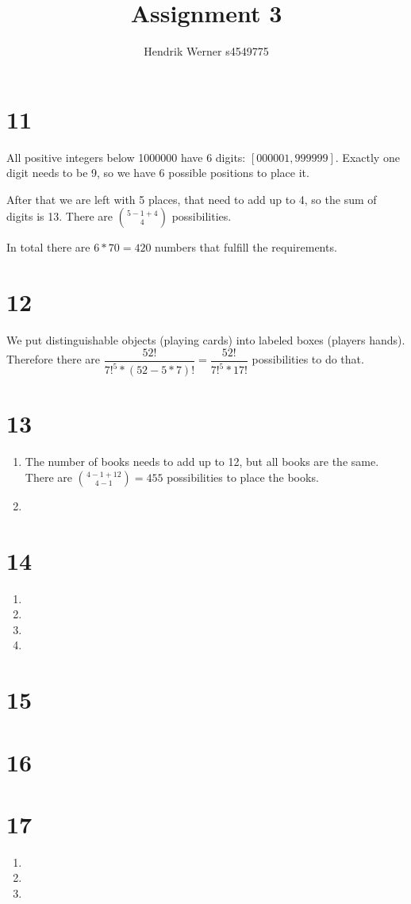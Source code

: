 \documentclass[12pt]{article}
\title{Assignment 3}
\author{
	Hendrik Werner s4549775
}
\begin{document}
\maketitle

\section*{11}
All positive integers below 1000000 have 6 digits: $[000001, 999999]$. Exactly one digit needs to be 9, so we have 6 possible positions to place it.

After that we are left with 5 places, that need to add up to 4, so the sum of digits is 13. There are $\binom{5 - 1 + 4}{4}$ possibilities.

In total there are $6 * 70 = 420$ numbers that fulfill the requirements.

\section*{12}
We put distinguishable objects (playing cards) into labeled boxes (players hands). Therefore there are $\dfrac{52!}{7!^5 * (52 - 5 * 7)!} =  \dfrac{52!}{7!^5 * 17!}$ possibilities to do that.

\section*{13}
\begin{enumerate}[a]
	\item %
	The number of books needs to add up to 12, but all books are the same. There are $\binom{4 - 1 + 12}{4 - 1} = 455$ possibilities to place the books.

	\item %
\end{enumerate}

\section*{14}
\begin{enumerate}[a]
	\item %
	\item %
	\item %
	\item %
\end{enumerate}

\section*{15}

\section*{16}

\section*{17}
\begin{enumerate}[a]
	\item %
	\item %
	\item %
\end{enumerate}
\end{document}
